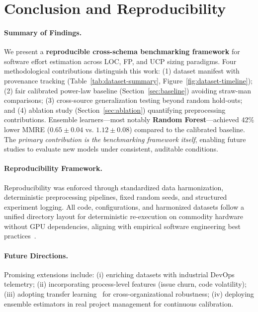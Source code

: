 \documentclass{ieeeaccess}
\begin{document}

\section{Conclusion and Reproducibility}

\paragraph{Summary of Findings.}
We present a \textbf{reproducible cross-schema benchmarking framework} for software effort estimation across LOC, FP, and UCP sizing paradigms.
Four methodological contributions distinguish this work:
(1) dataset manifest with provenance tracking (Table~\ref{tab:dataset-summary}, Figure~\ref{fig:dataset-timeline});
(2) fair calibrated power-law baseline (Section~\ref{sec:baseline}) avoiding straw-man comparisons;
(3) cross-source generalization testing beyond random hold-outs; and
(4) ablation study (Section~\ref{sec:ablation}) quantifying preprocessing contributions.
Ensemble learners---most notably \textbf{Random Forest}---achieved 42\% lower MMRE ($0.65 \pm 0.04$ vs. $1.12 \pm 0.08$) compared to the calibrated baseline. The \emph{primary contribution is the benchmarking framework itself}, enabling future studies to evaluate new models under consistent, auditable conditions.

\paragraph{Reproducibility Framework.}
Reproducibility was enforced through standardized data harmonization, deterministic preprocessing pipelines, fixed random seeds, and structured experiment logging. All code, configurations, and harmonized datasets follow a unified directory layout for deterministic re-execution on commodity hardware without GPU dependencies, aligning with empirical software engineering best practices~\cite{cruz2019open,lopez2021empirical}.

\paragraph{Future Directions.}
Promising extensions include: (i) enriching datasets with industrial DevOps telemetry; (ii) incorporating process-level features (issue churn, code volatility); (iii) adopting transfer learning~\cite{yu2021transfer} for cross-organizational robustness; (iv) deploying ensemble estimators in real project management for continuous calibration.
\end{document}
